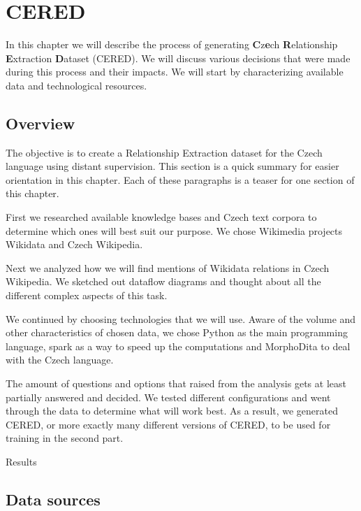 \chapter{CERED}

In this chapter we will describe the process of generating \textbf{C}z\textbf{e}ch \textbf{R}elationship \textbf{E}xtraction \textbf{D}ataset (CERED). We will discuss various decisions that were made during this process and their impacts.
We will start by characterizing available data and technological resources. 





\section{Overview}

The objective is to create a Relationship Extraction dataset for the Czech language using distant supervision. This section is a quick summary for easier orientation in this chapter. Each of these paragraphs is a teaser for one section of this chapter.

First we researched available knowledge bases and Czech text corpora to determine which ones will best suit our purpose. We chose Wikimedia projects Wikidata and Czech Wikipedia.

Next we analyzed how we will find mentions of Wikidata relations in Czech Wikipedia. We sketched out dataflow diagrams and thought about all the different complex aspects of this task.

We continued by choosing technologies that we will use. Aware of the volume and other characteristics of chosen data, we chose Python as the main programming language, spark as a way to speed up the computations and MorphoDita to deal with the Czech language.

The amount of questions and options that raised from the analysis gets at least partially answered and decided. We tested different configurations and went through the data to determine what will work best. As a result, we generated CERED, or more exactly many different versions of CERED, to be used for training in the second part. 

Results



\section{Data sources}


